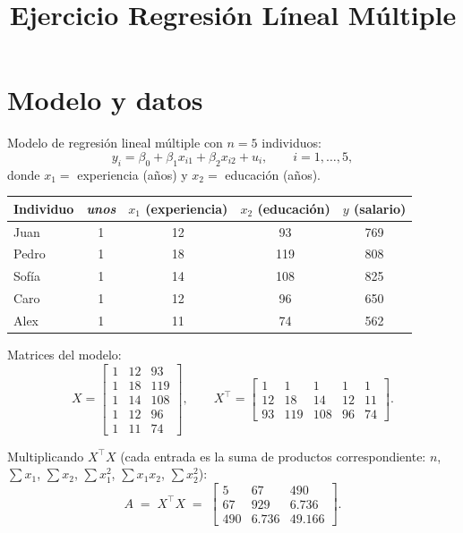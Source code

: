 \documentclass[11pt]{article}
\title{\vspace{-1.5em} Ejercicio Regresión L\'ineal M\'ultiple}
\author{}
\date{}
\begin{document}
\maketitle
\vspace{-2.5em}

\section{Modelo y datos}

Modelo de regresión lineal múltiple con $n=5$ individuos:
\[
  y_i = \beta_0 + \beta_1 x_{i1} + \beta_2 x_{i2} + u_i, \qquad i=1,\dots,5,
\]
donde $x_{1}=$ experiencia (años) y $x_{2}=$ educación (años).

\begin{center}
\begin{tabular}{lcccc}
\toprule
Individuo & \emph{unos} & $x_1$ (experiencia) & $x_2$ (educación) & $y$ (salario) \\
\midrule
Juan  & 1 & 12 & 93  & 769 \\
Pedro & 1 & 18 & 119 & 808 \\
Sofía & 1 & 14 & 108 & 825 \\
Caro  & 1 & 12 & 96  & 650 \\
Alex  & 1 & 11 & 74  & 562 \\
\bottomrule
\end{tabular}
\end{center}

\bigskip
\noindent Matrices del modelo:
\[
  X=\begin{bmatrix}
    1 & 12 & 93\\
    1 & 18 & 119\\
    1 & 14 & 108\\
    1 & 12 & 96\\
    1 & 11 & 74
  \end{bmatrix},
  \qquad
  X^\top=\begin{bmatrix}
    1 & 1 & 1 & 1 & 1\\
    12 & 18 & 14 & 12 & 11\\
    93 & 119 & 108 & 96 & 74
  \end{bmatrix}.
\]

Multiplicando $X^\top X$ (cada entrada es la suma de productos correspondiente: $n$, $\sum x_1$, $\sum x_2$, $\sum x_1^2$, $\sum x_1 x_2$, $\sum x_2^2$):
\[
  A \;=\; X^\top X \;=\;
  \begin{bmatrix}
    5 & 67 & 490\\
    67 & 929 & 6.736\\
    490 & 6.736 & 49.166
  \end{bmatrix}.
\]
\end{document}
